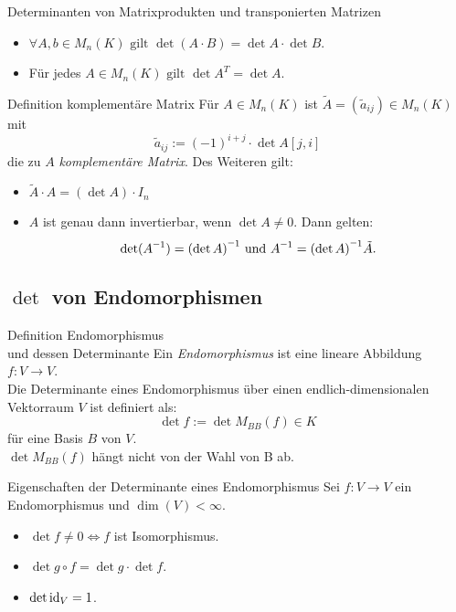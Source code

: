 \documentclass[main.tex]{subfiles}
\begin{document}
\begin{karte}{Determinanten von Matrixprodukten und transponierten Matrizen}
    \begin{itemize}
        \item \(\forall A,b \in M_n(K) \text{ gilt } 
        \det(A \cdot B) = \det A \cdot \det B\).
        \item Für jedes \(A \in M_n(K) \text{ gilt } 
        \det A^T = \det A\).
    \end{itemize}
\end{karte}
\begin{karte}{Definition komplementäre Matrix}
    Für \(A \in M_n(K)\) ist \(\tilde{A} = (\tilde{a}_{ij}) \in M_n(K)\) mit
    \[\tilde{a}_{ij} := {(-1)}^{i+j} \cdot \det A[j,i]\]
    die zu \(A\) \textit{komplementäre Matrix}.
    Des Weiteren gilt:
    \begin{itemize}
        \item \(\tilde{A} \cdot A = (\det A) \cdot I_n\)
        \item \(A\) ist genau dann invertierbar, wenn \(\det A \neq 0\). Dann gelten: 
        \[\det(\inverse A) = \inverse{(\det A)} \text{ und }
         \inverse A = \inverse{(\det A)} \tilde{A}.\]
    \end{itemize}
\end{karte}

\subsection*{\( \det \) von Endomorphismen}

\begin{karte}{Definition Endomorphismus\\und dessen Determinante}
    Ein \textit{Endomorphismus} ist eine lineare Abbildung 
    \( f: V \rightarrow V \).\\
    Die Determinante eines Endomorphismus über einen endlich-dimensionalen 
    Vektorraum \(V\) ist definiert als:
    \[ \det f := \det M_{BB}(f) \in K \]
    für eine Basis \(B\) von \(V\).\\
    \(\det M_{BB}(f)\) hängt nicht von der Wahl von B ab. 
\end{karte}
\begin{karte}{Eigenschaften der Determinante eines Endomorphismus}
    Sei \(f: V \rightarrow V\) ein Endomorphismus und \( \dim(V) < \infty \).
    \begin{itemize}
        \item \(\det f \neq 0 \Leftrightarrow f\) ist Isomorphismus.
        \item \(\det g \circ f = \det g \cdot \det f\).
        \item \(\det \operatorname{id}_V = 1\).
    \end{itemize}
\end{karte}
\end{document}
